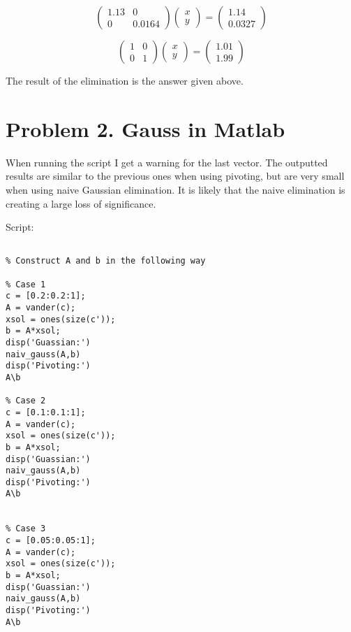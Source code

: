 \documentclass[]{article}
\begin{document}
\[
\left(\begin{array}{ccc} 
1.13 & 0 \\
0 & 0.0164
\end{array}\right)
\left(\begin{array}{c} 
x \\
y
\end{array}\right) =
\left(\begin{array}{c}
1.14 \\
0.0327
\end{array}\right)
\]

\[
\left(\begin{array}{ccc} 
1 & 0 \\
0 & 1
\end{array}\right)
\left(\begin{array}{c} 
x \\
y
\end{array}\right) =
\left(\begin{array}{c}
1.01 \\
1.99
\end{array}\right)
\]

The result of the elimination is the answer given above.

\section{Problem 2. Gauss in Matlab}\label{problem-2.-gauss-in-matlab}

When running the script I get a warning for the last vector. The
outputted results are similar to the previous ones when using pivoting,
but are very small when using naive Gaussian elimination. It is likely
that the naive elimination is creating a large loss of significance.

Script:

\begin{verbatim}

% Construct A and b in the following way

% Case 1
c = [0.2:0.2:1];
A = vander(c);
xsol = ones(size(c'));
b = A*xsol;
disp('Guassian:')
naiv_gauss(A,b)
disp('Pivoting:')
A\b

% Case 2
c = [0.1:0.1:1];
A = vander(c);
xsol = ones(size(c'));
b = A*xsol;
disp('Guassian:')
naiv_gauss(A,b)
disp('Pivoting:')
A\b


% Case 3
c = [0.05:0.05:1];
A = vander(c);
xsol = ones(size(c'));
b = A*xsol;
disp('Guassian:')
naiv_gauss(A,b)
disp('Pivoting:')
A\b
\end{verbatim}
\end{document}
